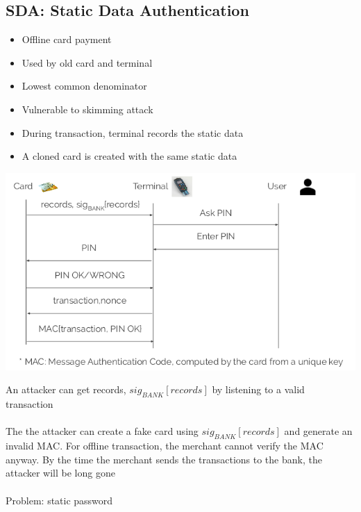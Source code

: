 \documentclass{article}[18pt]
\begin{document}
\subsection{SDA: Static Data Authentication}
\begin{itemize}
	\item Offline card payment
	\item Used by old card and terminal
	\item Lowest common denominator
	\item Vulnerable to skimming attack
	\item During transaction, terminal records the static data
	\item A cloned card is created with the same static data
\end{itemize}
\begin{center}
	\includegraphics[scale=0.7]{EMV}
\end{center}
An attacker can get records, $sig_{BANK}[records]$ by listening to a valid transaction\\
\\
The the attacker can create a fake card using $sig_{BANK}[records]$ and generate an invalid MAC. For offline transaction, the merchant cannot verify the MAC anyway. By the time the merchant sends the transactions to the bank, the attacker will be long gone\\
\\
Problem: static password\\
\\
\end{document}
